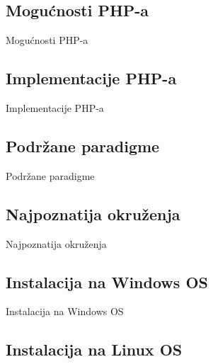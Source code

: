 \documentclass{beamer}
\begin{document}
\subsection{Mogućnosti PHP-a}
\begin{frame}{Mogućnosti PHP-a}
    
\end{frame}

\subsection{Implementacije PHP-a}
\begin{frame}{Implementacije PHP-a}
    
\end{frame}

\subsection{Podržane paradigme}
\begin{frame}{Podržane paradigme}
    
\end{frame}


\subsection{Najpoznatija okruženja}
\begin{frame}{Najpoznatija okruženja}
    
\end{frame}

\subsection{Instalacija na Windows OS}

\begin{frame}{Instalacija na Windows OS}



\end{frame}

\subsection{Instalacija na Linux OS}
\end{document}

